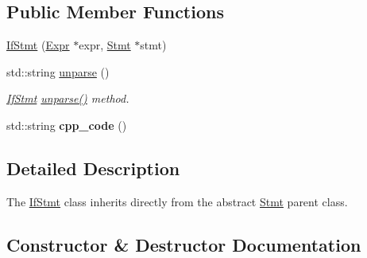 \subsection*{Public Member Functions}
\begin{DoxyCompactItemize}
\item 
\hyperlink{classfcal_1_1ast_1_1IfStmt_aaf938559e1c0ebedd6b670a88323af19}{If\+Stmt} (\hyperlink{classfcal_1_1ast_1_1Expr}{Expr} $\ast$expr, \hyperlink{classfcal_1_1ast_1_1Stmt}{Stmt} $\ast$stmt)
\item 
std\+::string \hyperlink{classfcal_1_1ast_1_1IfStmt_acf7d0fbe7a9ff597216a23992f603062}{unparse} ()
\begin{DoxyCompactList}\small\item\em \hyperlink{classfcal_1_1ast_1_1IfStmt}{If\+Stmt} \hyperlink{classfcal_1_1ast_1_1IfStmt_acf7d0fbe7a9ff597216a23992f603062}{unparse()} method. \end{DoxyCompactList}\item 
std\+::string {\bfseries cpp\+\_\+code} ()\hypertarget{classfcal_1_1ast_1_1IfStmt_aff4861d1e02ebf4de6a8ae65e5473fc5}{}\label{classfcal_1_1ast_1_1IfStmt_aff4861d1e02ebf4de6a8ae65e5473fc5}

\end{DoxyCompactItemize}


\subsection{Detailed Description}
The \hyperlink{classfcal_1_1ast_1_1IfStmt}{If\+Stmt} class inherits directly from the abstract \hyperlink{classfcal_1_1ast_1_1Stmt}{Stmt} parent class. 

\subsection{Constructor \& Destructor Documentation}
